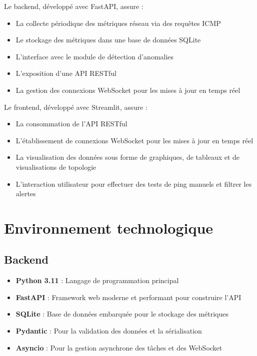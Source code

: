 \documentclass[12pt,a4paper]{report}
\begin{document}
Le backend, développé avec FastAPI, assure :
\begin{itemize}
    \item La collecte périodique des métriques réseau via des requêtes ICMP
    \item Le stockage des métriques dans une base de données SQLite
    \item L'interface avec le module de détection d'anomalies
    \item L'exposition d'une API RESTful
    \item La gestion des connexions WebSocket pour les mises à jour en temps réel
\end{itemize}

Le frontend, développé avec Streamlit, assure :
\begin{itemize}
    \item La consommation de l'API RESTful
    \item L'établissement de connexions WebSocket pour les mises à jour en temps réel
    \item La visualisation des données sous forme de graphiques, de tableaux et de visualisations de topologie
    \item L'interaction utilisateur pour effectuer des tests de ping manuels et filtrer les alertes
\end{itemize}

\section{Environnement technologique}
\subsection{Backend}
\begin{itemize}
    \item \textbf{Python 3.11} : Langage de programmation principal
    \item \textbf{FastAPI} : Framework web moderne et performant pour construire l'API
    \item \textbf{SQLite} : Base de données embarquée pour le stockage des métriques
    \item \textbf{Pydantic} : Pour la validation des données et la sérialisation
    \item \textbf{Asyncio} : Pour la gestion asynchrone des tâches et des WebSocket
\end{itemize}
\end{document}
